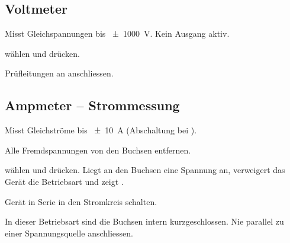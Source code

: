 \subsection{Voltmeter}
\label{sec:mode_volt}
Misst Gleichspannungen bis \qty{\pm1000}{\volt}. Kein Ausgang aktiv.
\begin{steps}
    \item {} wählen und  drücken.
    \item Prüfleitungen an  anschliessen.
\end{steps}

\subsection{Ampmeter -- Strommessung}
\label{sec:mode_amp}
Misst Gleichströme bis \qty{\pm10}{\ampere} (Abschaltung bei ).
\begin{steps}
    \item Alle Fremdspannungen von den Buchsen entfernen.
    \item {} wählen und  drücken. Liegt an den Buchsen eine Spannung an,
          verweigert das Gerät die Betriebsart und zeigt .
    \item Gerät in Serie in den Stromkreis schalten.
\end{steps}
\begin{warning}
    In dieser Betriebsart sind die Buchsen intern kurzgeschlossen. Nie parallel zu einer
    Spannungsquelle anschliessen.
\end{warning}
